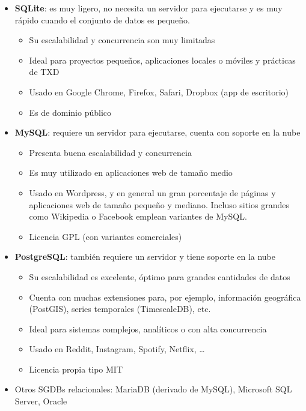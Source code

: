 \documentclass[
]{book}
\providecommand{\tightlist}{%
  \setlength{\itemsep}{0pt}\setlength{\parskip}{0pt}}
\begin{document}
\begin{itemize}
\tightlist
\item
  \textbf{SQLite}: es muy ligero, no necesita un servidor para ejecutarse y es muy rápido cuando el conjunto de datos es pequeño.

  \begin{itemize}
  \tightlist
  \item
    Su escalabilidad y concurrencia son muy limitadas
  \item
    Ideal para proyectos pequeños, aplicaciones locales o móviles y prácticas de TXD
  \item
    Usado en Google Chrome, Firefox, Safari, Dropbox (app de escritorio)
  \item
    Es de dominio público
  \end{itemize}
\item
  \textbf{MySQL}: requiere un servidor para ejecutarse, cuenta con soporte en la nube

  \begin{itemize}
  \tightlist
  \item
    Presenta buena escalabilidad y concurrencia
  \item
    Es muy utilizado en aplicaciones web de tamaño medio
  \item
    Usado en Wordpress, y en general un gran porcentaje de páginas y aplicaciones web de tamaño pequeño y mediano. Incluso sitios grandes como Wikipedia o Facebook emplean variantes de MySQL.
  \item
    Licencia GPL (con variantes comerciales)
  \end{itemize}
\item
  \textbf{PostgreSQL}: también requiere un servidor y tiene soporte en la nube

  \begin{itemize}
  \tightlist
  \item
    Su escalabilidad es excelente, óptimo para grandes cantidades de datos
  \item
    Cuenta con muchas extensiones para, por ejemplo, información geográfica (PostGIS), series temporales (TimescaleDB), etc.
  \item
    Ideal para sistemas complejos, analíticos o con alta concurrencia
  \item
    Usado en Reddit, Instagram, Spotify, Netflix, \ldots{}
  \item
    Licencia propia tipo MIT
  \end{itemize}
\item
  Otros SGDBs relacionales: MariaDB (derivado de MySQL), Microsoft SQL Server, Oracle
\end{itemize}
\end{document}
